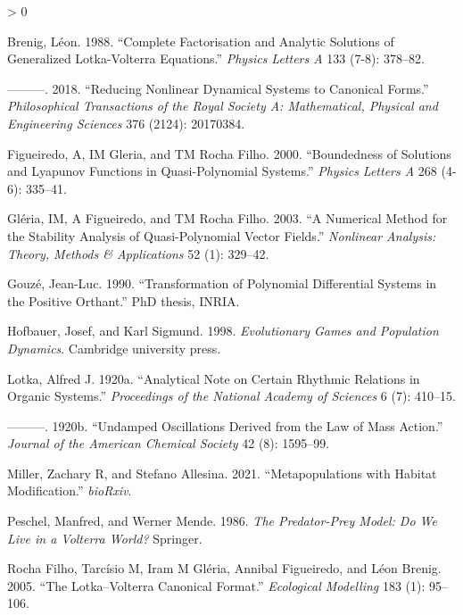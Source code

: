 \documentclass{article}
\newlength{\cslhangindent}
\newenvironment{CSLReferences}[2] %
 {%
  \setlength{\parindent}{0pt}
  \ifodd #1 \everypar{\setlength{\hangindent}{\cslhangindent}}\ignorespaces\fi
  \ifnum #2 > 0
  \setlength{\parskip}{#2\baselineskip}
  \fi
 }%
 {}
\begin{document}
\hypertarget{refs}{}
\begin{CSLReferences}{1}{0}
\leavevmode\hypertarget{ref-brenig1988complete}{}%
Brenig, Léon. 1988. {``Complete Factorisation and Analytic Solutions of
Generalized Lotka-Volterra Equations.''} \emph{Physics Letters A} 133
(7-8): 378--82.

\leavevmode\hypertarget{ref-brenig2018reducing}{}%
---------. 2018. {``Reducing Nonlinear Dynamical Systems to Canonical
Forms.''} \emph{Philosophical Transactions of the Royal Society A:
Mathematical, Physical and Engineering Sciences} 376 (2124): 20170384.

\leavevmode\hypertarget{ref-figueiredo2000boundedness}{}%
Figueiredo, A, IM Gleria, and TM Rocha Filho. 2000. {``Boundedness of
Solutions and Lyapunov Functions in Quasi-Polynomial Systems.''}
\emph{Physics Letters A} 268 (4-6): 335--41.

\leavevmode\hypertarget{ref-gleria2003numerical}{}%
Gléria, IM, A Figueiredo, and TM Rocha Filho. 2003. {``A Numerical
Method for the Stability Analysis of Quasi-Polynomial Vector Fields.''}
\emph{Nonlinear Analysis: Theory, Methods \& Applications} 52 (1):
329--42.

\leavevmode\hypertarget{ref-gouze1990transformation}{}%
Gouzé, Jean-Luc. 1990. {``Transformation of Polynomial Differential
Systems in the Positive Orthant.''} PhD thesis, INRIA.

\leavevmode\hypertarget{ref-hofbauer1998evolutionary}{}%
Hofbauer, Josef, and Karl Sigmund. 1998. \emph{Evolutionary Games and
Population Dynamics}. Cambridge university press.

\leavevmode\hypertarget{ref-lotka1920analytical}{}%
Lotka, Alfred J. 1920a. {``Analytical Note on Certain Rhythmic Relations
in Organic Systems.''} \emph{Proceedings of the National Academy of
Sciences} 6 (7): 410--15.

\leavevmode\hypertarget{ref-lotka1920undamped}{}%
---------. 1920b. {``Undamped Oscillations Derived from the Law of Mass
Action.''} \emph{Journal of the American Chemical Society} 42 (8):
1595--99.

\leavevmode\hypertarget{ref-miller2021metapopulations}{}%
Miller, Zachary R, and Stefano Allesina. 2021. {``Metapopulations with
Habitat Modification.''} \emph{bioRxiv}.

\leavevmode\hypertarget{ref-peschel1986predator}{}%
Peschel, Manfred, and Werner Mende. 1986. \emph{The Predator-Prey Model:
Do We Live in a Volterra World?} Springer.

\leavevmode\hypertarget{ref-rocha2005lotka}{}%
Rocha Filho, Tarcísio M, Iram M Gléria, Annibal Figueiredo, and Léon
Brenig. 2005. {``The Lotka--Volterra Canonical Format.''}
\emph{Ecological Modelling} 183 (1): 95--106.


\end{CSLReferences}
\end{document}
